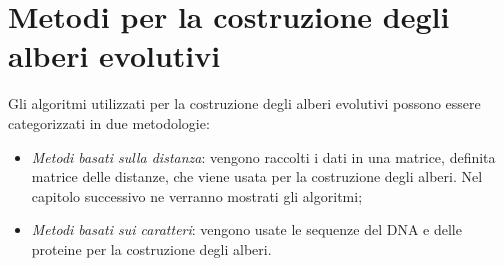 \section{Metodi per la costruzione degli alberi evolutivi}
Gli algoritmi utilizzati per la costruzione degli alberi evolutivi possono essere categorizzati in due metodologie:
\begin{itemize}
	\item \textit{Metodi basati sulla distanza}: vengono raccolti i dati in una matrice, definita matrice delle distanze, che viene usata per la costruzione degli alberi. Nel capitolo successivo ne verranno mostrati gli algoritmi;
	\item \textit{Metodi basati sui caratteri}: vengono usate le sequenze del DNA e delle proteine per la costruzione degli alberi.
\end{itemize}
